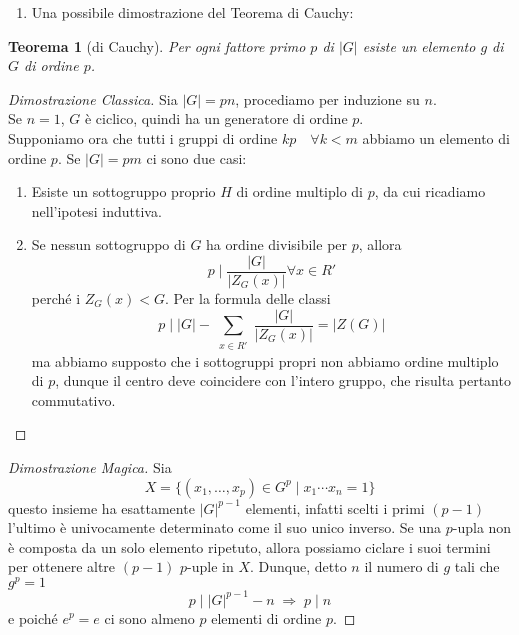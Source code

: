\documentclass[a4paper]{article}
\newtheorem{theorem}{Teorema}[section]
\theoremstyle{remark}
\theoremstyle{definition}
\begin{document}
\begin{multicols}{2}
\begin{enumerate}
	\item Una possibile dimostrazione del Teorema di Cauchy:
\end{enumerate}

\begin{theorem}[di Cauchy]
	Per ogni fattore primo $ p $ di $ |G| $ esiste un elemento $ g $ di $ G $ di ordine $ p $.
\end{theorem}
\begin{proof}[Dimostrazione Classica]
	Sia $ |G|= pn $, procediamo per induzione su $ n $. \\
	Se $ n = 1 $, $ G $ è ciclico, quindi ha un generatore di ordine $ p $. \\
	Supponiamo ora che tutti i gruppi di ordine $ kp  \quad\forall k < m$ abbiamo un elemento di ordine $ p $. Se $ |G|=pm $ ci sono due casi:
	\begin{enumerate}
		\item Esiste un sottogruppo proprio $ H $ di ordine multiplo di $ p $, da cui ricadiamo nell'ipotesi induttiva.
		\item Se nessun sottogruppo di $ G $ ha ordine divisibile per $ p $, allora
		\[ p \mid \frac{|G|}{|Z_G(x)|} \forall x \in R' \] perché i $ Z_G(x) < G $. Per la formula delle classi
		\[ p \mid |G| - \sum_{\substack{x \in R'}} \frac{|G|}{|Z_G(x)|} = |Z(G)| \]
		ma abbiamo supposto che i sottogruppi propri non abbiamo ordine multiplo di $ p $, dunque il centro deve coincidere con l'intero gruppo, che risulta pertanto commutativo.
	\end{enumerate}
\end{proof}
\begin{proof}[Dimostrazione Magica]
	Sia $$ X = \{(x_1, \dots, x_p) \in G^p \mid x_1\cdots x_n = 1 \} $$ questo insieme ha esattamente $ |G|^{p-1} $ elementi, infatti scelti i primi $ (p-1) $ l'ultimo è univocamente determinato come il suo unico inverso. Se una $ p $-upla non è composta da un solo elemento ripetuto, allora possiamo ciclare i suoi termini per ottenere altre $ (p-1) $ $ p $-uple in $ X $. Dunque, detto $ n $ il numero di $ g $ tali che $ g^p = 1 $ \[ p \mid |G|^{p-1} - n \;\Rightarrow\; p \mid n \] e poiché $ e^p = e $ ci sono almeno $ p $ elementi di ordine $ p $.
\end{proof}


\end{multicols}
\end{document}
